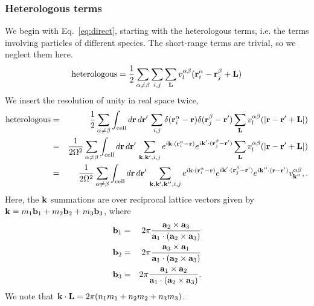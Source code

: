 \subsubsection{Heterologous terms}
We begin with Eq.~\ref{eq:direct}, starting with the heterologous terms,
i.e. the terms involving particles of different species.  The
short-range terms are trivial, so we neglect them here.
\begin{equation}
\text{heterologous} = \frac{1}{2} \sum_{\alpha \neq \beta} \sum_{i,j} \sum_{\mathbf{L}}
v^{\alpha\beta}_l(\mathbf{r}_i^\alpha - \mathbf{r}_j^\beta + \mathbf{L})
\end{equation}
We insert the resolution of unity in real space twice,
\begin{eqnarray}
\text{heterologous} & = & \frac{1}{2}\sum_{\alpha \neq \beta} \int_\text{cell} d\mathbf{r} \, d\mathbf{r}' \, \sum_{i,j}
\delta(\mathbf{r}_i^\alpha - \mathbf{r}) \delta(\mathbf{r}_j^\beta-\mathbf{r}') \sum_{\mathbf{L}}
v^{\alpha\beta}_l(|\mathbf{r} - \mathbf{r}' + \mathbf{L}|) \\
& = & \frac{1}{2\Omega^2}\sum_{\alpha \neq \beta} \int_\text{cell} d\mathbf{r} \, d\mathbf{r}' \, \sum_{\mathbf{k}, \mathbf{k}', i, j} e^{i\mathbf{k}\cdot(\mathbf{r}_i^\alpha
  - \mathbf{r})} e^{i\mathbf{k}'\cdot(\mathbf{r}_j^\beta - \mathbf{r}')} \sum_{\mathbf{L}}
v^{\alpha\beta}_l(|\mathbf{r} - \mathbf{r}' + \mathbf{L}|) \nonumber \\
& = & \frac{1}{2\Omega^2} \sum_{\alpha \neq \beta} \int_\text{cell} d\mathbf{r} \, d\mathbf{r}'\,
\sum_{\mathbf{k}, \mathbf{k}', \mathbf{k}'', i, j} e^{i\mathbf{k}\cdot(\mathbf{r}_i^\alpha - \mathbf{r})}
e^{i\mathbf{k}'\cdot(\mathbf{r}_j^\beta-\mathbf{r}')} e^{i\mathbf{k}''\cdot(\mathbf{r} -\mathbf{r}')}
v^{\alpha\beta}_{\mathbf{k}''}, \nonumber.
\end{eqnarray}
Here, the $\mathbf{k}$ summations are over reciprocal lattice vectors given
by $\mathbf{k} = m_1 \mathbf{b}_1 + m_2\mathbf{b}_2 + m_3\mathbf{b}_3$, where
\begin{eqnarray}
\mathbf{b}_1 & = & 2\pi \frac{\mathbf{a}_2 \times \mathbf{a}_3}{\mathbf{a}_1 \cdot (\mathbf{a}_2 \times
  \mathbf{a}_3)} \nonumber \\
\mathbf{b}_2 & = & 2\pi \frac{\mathbf{a}_3 \times \mathbf{a}_1}{\mathbf{a}_1 \cdot (\mathbf{a}_2 \times
  \mathbf{a}_3)} \\
\mathbf{b}_3 & = & 2\pi \frac{\mathbf{a}_1 \times \mathbf{a}_2}{\mathbf{a}_1 \cdot (\mathbf{a}_2 \times
  \mathbf{a}_3)} \nonumber.
\end{eqnarray}
We note that $\mathbf{k} \cdot \mathbf{L} = 2\pi(n_1 m_1 + n_2 m_2 + n_3 m_3)$. 

